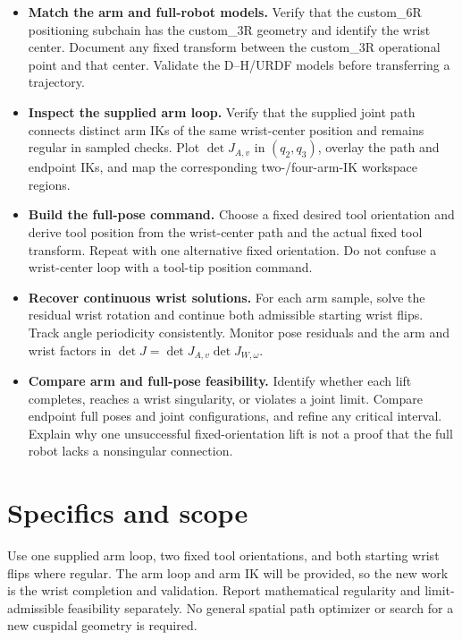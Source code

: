 \documentclass[11pt,a4paper]{article}
\begin{document}
\begin{itemize}
  \item \textbf{Match the arm and full-robot models.} Verify that the custom\_6R
positioning subchain has the custom\_3R geometry and identify the wrist center.
Document any fixed transform between the custom\_3R operational point and
that center. Validate the D--H/URDF models before transferring a trajectory.

  \item \textbf{Inspect the supplied arm loop.} Verify that the supplied joint path
connects distinct arm IKs of the same wrist-center position and remains
regular in sampled checks. Plot $\det J_{A,v}$ in $(q_2,q_3)$, overlay the
path and endpoint IKs, and map the corresponding two-/four-arm-IK workspace
regions.

  \item \textbf{Build the full-pose command.} Choose a fixed desired tool orientation
and derive tool position from the wrist-center path and the actual fixed
tool transform. Repeat with one alternative fixed orientation. Do not
confuse a wrist-center loop with a tool-tip position command.

  \item \textbf{Recover continuous wrist solutions.} For each arm sample, solve the
residual wrist rotation and continue both admissible starting wrist flips.
Track angle periodicity consistently. Monitor pose residuals and the arm
and wrist factors in $\det J=\det J_{A,v}\det J_{W,\omega}$.

  \item \textbf{Compare arm and full-pose feasibility.} Identify whether each lift
completes, reaches a wrist singularity, or violates a joint limit. Compare
endpoint full poses and joint configurations, and refine any critical
interval. Explain why one unsuccessful fixed-orientation lift is not a
proof that the full robot lacks a nonsingular connection.
\end{itemize}

\newpage
\section*{Specifics and scope}
Use one supplied arm loop, two fixed tool orientations, and both
starting wrist flips where regular. The arm loop and arm IK will be provided,
so the new work is the wrist completion and validation. Report mathematical
regularity and limit-admissible feasibility separately. No general spatial
path optimizer or search for a new cuspidal geometry is required.
\end{document}
